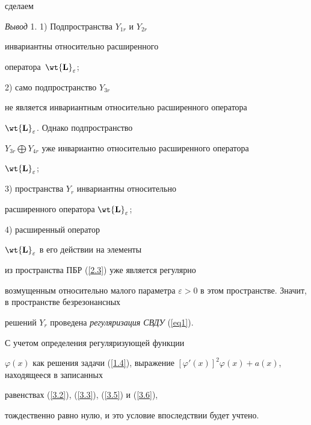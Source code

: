 сделаем


\medskip





{\it Вывод} 1. 1) Подпространства $Y_{1r}$ и $ Y_{2r}$


инвариантны относительно расширенного 


оператора~${\wt{\bold L}_{\varepsilon}}$;





2) само подпространство $Y_{3r}$


не является инвариантным относительно расширенного оператора


${\wt{\bold L}_{\varepsilon}}$. Однако подпространство


$Y_{3r}\bigoplus Y_{4r}$ уже инвариантно относительно расширенного оператора


${\wt{\bold L}_{\varepsilon}}$;





3) пространства $Y_r$ инвариантны относительно


расширенного оператора ${\wt{\bold L}_{\varepsilon }}$;





4) расширенный оператор


${\wt{\bold L}_{\varepsilon}}$ в его действии на элементы


из пространства ПБР (\ref{2.3}) уже является регулярно


возмущенным относительно малого параметра $\varepsilon


> 0$ в этом пространстве. Значит, в пространстве безрезонансных


решений $Y_r$ проведена {\it регуляризация СВДУ} (\ref{eq1}).








\begin{note}


С учетом определения регуляризующей функции


$\varphi (x)$ как решения задачи (\ref{1.4}), выражение $ [\varphi


'(x)]^2 \varphi (x) + a (x)$, находящееся в записанных


равенствах (\ref{3.2}), (\ref{3.3}), (\ref{3.5}) и (\ref{3.6}),


тождественно равно нулю, и это условие впоследствии будет учтено.


\end{note}








